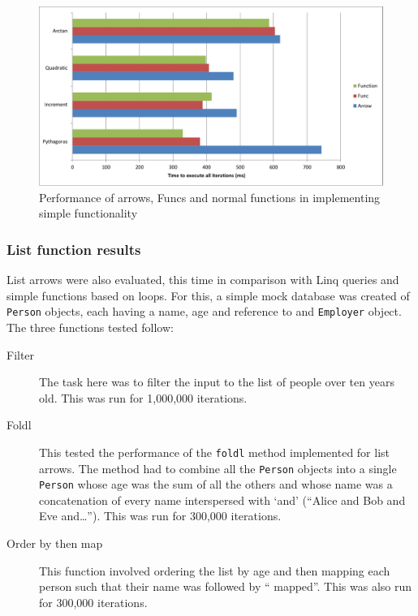 \documentclass[12pt,twoside,notitlepage]{report}
\begin{document}
\begin{figure}[!ht]
  \centering
  \includegraphics[width=\textwidth]{fig/SimpleFunctionPerformanceChart.pdf}
  \caption{Performance of arrows, Funcs and normal functions in implementing simple functionality}
  \label{fig:simple_function_performance}
\end{figure}

\subsubsection{List function results}

List arrows were also evaluated, this time in comparison with Linq queries and simple functions based on loops. For this, a simple mock database was created of \texttt{Person} objects, each having a name, age and reference to and \texttt{Employer} object. The three functions tested follow:

\begin{description}
	\item[Filter] The task here was to filter the input to the list of people over ten years old. This was run for 1,000,000 iterations.
	\item[Foldl] This tested the performance of the \texttt{foldl} method implemented for list arrows. The method had to combine all the \texttt{Person} objects into a single \texttt{Person} whose age was the sum of all the others and whose name was a concatenation of every name interspersed with `and' (``Alice and Bob and Eve and\ldots''). This was run for 300,000 iterations.
	\item[Order by then map] This function involved ordering the list by age and then mapping each person such that their name was followed by `` mapped''. This was also run for 300,000 iterations.
\end{description}
\end{document}

